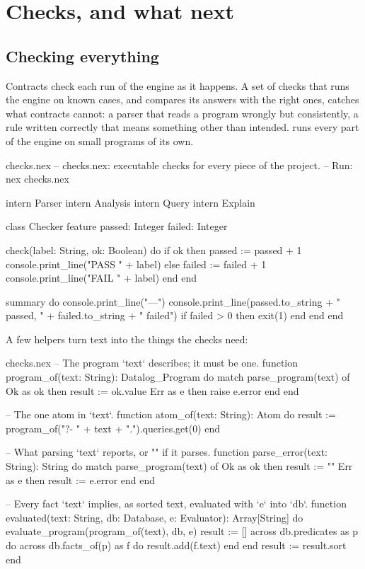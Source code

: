 \chapter{Checks, and what next}\label{ch:next}

\section{Checking everything}

Contracts check each run of the engine as it happens. A set of checks that
runs the engine on known cases, and compares its answers with the right
ones, catches what contracts cannot: a parser that reads a program wrongly
but consistently, a rule written correctly that means something other than
intended.  runs every part of the engine on small programs
of its own.

\begin{newfile}{checks.nex}
-- checks.nex: executable checks for every piece of the project.
-- Run: nex checks.nex

intern Parser
intern Analysis
intern Query
intern Explain

class Checker
feature
  passed: Integer
  failed: Integer

  check(label: String, ok: Boolean)
  do
    if ok then
      passed := passed + 1
      console.print_line("PASS " + label)
    else
      failed := failed + 1
      console.print_line("FAIL " + label)
    end
  end

  summary
  do
    console.print_line("---")
    console.print_line(passed.to_string + " passed, " + failed.to_string + " failed")
    if failed > 0 then
      exit(1)
    end
  end
end
\end{newfile}

A few helpers turn text into the things the checks need:

\begin{continued}{checks.nex}
-- The program `text` describes; it must be one.
function program_of(text: String): Datalog_Program
do
  match parse_program(text) of
    Ok as ok then result := ok.value
    Err as e then raise e.error
  end
end

-- The one atom in `text`.
function atom_of(text: String): Atom
do
  result := program_of("?- " + text + ".").queries.get(0)
end

-- What parsing `text` reports, or "" if it parses.
function parse_error(text: String): String
do
  match parse_program(text) of
    Ok as ok then result := ""
    Err as e then result := e.error
  end
end

-- Every fact `text` implies, as sorted text, evaluated with `e` into `db`.
function evaluated(text: String, db: Database, e: Evaluator): Array[String]
do
  evaluate_program(program_of(text), db, e)
  result := []
  across db.predicates as p do
    across db.facts_of(p) as f do
      result.add(f.text)
    end
  end
  result := result.sort
end
\end{continued}

